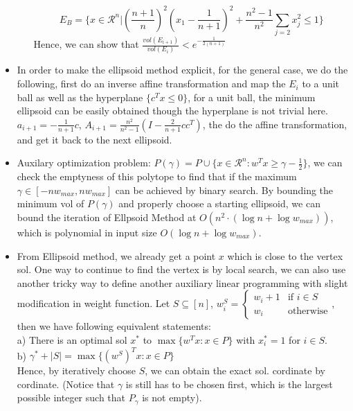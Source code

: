 \documentclass{article}
\begin{document}
\begin{itemize}
\begin{itemize}
\begin{equation*}
E_B=\big\{x\in\mathcal{R}^n\big| (\dfrac{n+1}{n})^2(x_1-\dfrac{1}{n+1})^2+\dfrac{n^2-1}{n^2}\underset{j=2}{\sum}x_j^2\leq 1\big\}
\end{equation*}
Hence, we can show that $\frac{vol(E_{i+1})}{vol(E_i)}<e^{-\frac{1}{2(n+1)}}$
\end{itemize}
\item In order to make the ellipsoid method explicit, for the general case, we do the following, first do an inverse affine transformation and map the $E_i$ to a unit ball as well as the hyperplane $\{c^Tx\leq 0\}$, for a unit ball, the minimum ellipsoid can be easily obtained though the hyperplane is not trivial here. $a_{i+1}=-\frac{1}{n+1}c$, $A_{i+1}=\frac{n^2}{n^2-1}(I-\frac{2}{n+1}cc^T)$, the do the affine transformation, and get it back to the next ellipsoid.
\item Auxilary optimization problem: $P(\gamma)=P\cup\{x\in\mathcal{R}^n: w^Tx\geq \gamma-\frac{1}{2}\}$, we can check the emptyness of this polytope to find that if the maximum $\gamma\in[-nw_{max},nw_{max}]$ can be achieved by binary search. By bounding the minimum vol of $P(\gamma)$ and properly choose a starting ellipsoid, we can bound the iteration of Ellpsoid Method at $O(n^2\cdot(\log n+\log w_{max}))$, which is polynomial in input size $O(\log n+\log w_{max})$.
\item From Ellipsoid method, we already get a point $x$ which is close to the vertex sol. One way to continue to find the vertex is by local search, we can also use another tricky way to define another auxiliary linear programming with slight modification in weight function. Let $S\subseteq[n]$, $w_i^S=\begin{cases}
w_i+1 &\text{if } i\in S\\
w_i &\text{otherwise}
\end{cases}$, then we have following equivalent statements:\\
a) There is an optimal sol $x^*$ to $\max\{w^Tx:x\in P\}$ with $x^*_i=1$ for $i\in S$.\\
b) $\gamma^*+|S|=\max\{(w^S)^Tx: x\in P\}$\\
Hence, by iteratively choose $S$, we can obtain the exact sol. cordinate by cordinate. (Notice that $\gamma$ is still has to be chosen first, which is the largest possible integer such that $P_{\gamma}$ is not empty).
\end{itemize}
\end{document}
